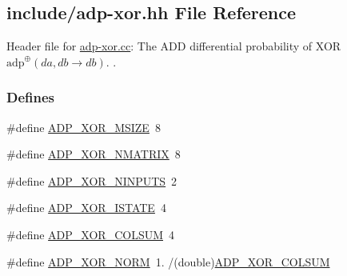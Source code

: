 \hypertarget{adp-xor_8hh}{\subsection{include/adp-\/xor.hh \-File \-Reference}
\label{adp-xor_8hh}
}


\-Header file for \hyperlink{adp-xor_8cc}{adp-\/xor.\-cc}\-: \-The \-A\-D\-D differential probability of \-X\-O\-R $\mathrm{adp}^{\oplus}(da,db \rightarrow db)$. .  


\subsubsection*{\-Defines}
\begin{DoxyCompactItemize}
\item 
\#define \hyperlink{adp-xor_8hh_a0eb2a8174404822fd98e1841f39c55dd}{\-A\-D\-P\-\_\-\-X\-O\-R\-\_\-\-M\-S\-I\-Z\-E}~8
\item 
\#define \hyperlink{adp-xor_8hh_ae26aa2787140d4e2542b3acc4611ecf3}{\-A\-D\-P\-\_\-\-X\-O\-R\-\_\-\-N\-M\-A\-T\-R\-I\-X}~8
\item 
\#define \hyperlink{adp-xor_8hh_a17a8e0ed3d596c6e1b05f81537f7b520}{\-A\-D\-P\-\_\-\-X\-O\-R\-\_\-\-N\-I\-N\-P\-U\-T\-S}~2
\item 
\#define \hyperlink{adp-xor_8hh_ab9bf379fcb41be94db14bfc28475dded}{\-A\-D\-P\-\_\-\-X\-O\-R\-\_\-\-I\-S\-T\-A\-T\-E}~4
\item 
\#define \hyperlink{adp-xor_8hh_a511ee77e898c4672872d3b4a5f2bd268}{\-A\-D\-P\-\_\-\-X\-O\-R\-\_\-\-C\-O\-L\-S\-U\-M}~4
\item 
\#define \hyperlink{adp-xor_8hh_acf6aa46ec71b361f53fd054b9e955817}{\-A\-D\-P\-\_\-\-X\-O\-R\-\_\-\-N\-O\-R\-M}~1. /(double)\hyperlink{adp-xor_8hh_a511ee77e898c4672872d3b4a5f2bd268}{\-A\-D\-P\-\_\-\-X\-O\-R\-\_\-\-C\-O\-L\-S\-U\-M}
\end{DoxyCompactItemize}

